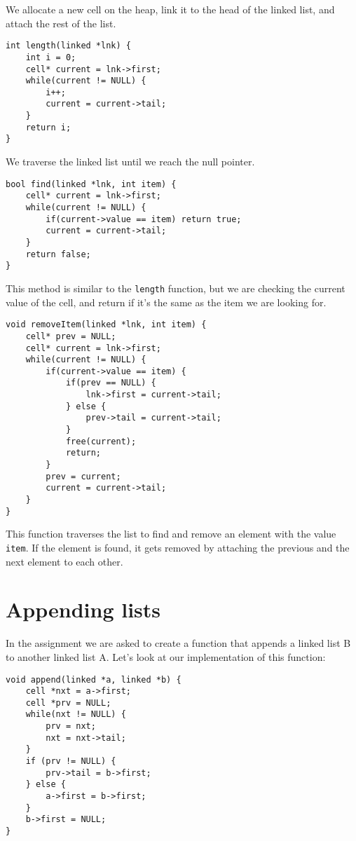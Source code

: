 \documentclass[a4paper,11pt]{article}
\begin{document}
    We allocate a new cell on the heap, link it to the head of the linked list, and attach the rest of the list.

    \begin{verbatim}
int length(linked *lnk) {
    int i = 0;
    cell* current = lnk->first;
    while(current != NULL) {
        i++;
        current = current->tail;
    }
    return i;
}
    \end{verbatim}

    We traverse the linked list until we reach the null pointer.

    \begin{verbatim}
bool find(linked *lnk, int item) {
    cell* current = lnk->first;
    while(current != NULL) {
        if(current->value == item) return true;
        current = current->tail;
    }
    return false;
}
    \end{verbatim}

    This method is similar to the {\tt length} function, but we are checking the current value of the cell, and return if it's the same as the item we are looking for.

    \begin{verbatim}
void removeItem(linked *lnk, int item) {
    cell* prev = NULL;
    cell* current = lnk->first;
    while(current != NULL) {
        if(current->value == item) {
            if(prev == NULL) {
                lnk->first = current->tail;
            } else {
                prev->tail = current->tail;
            }
            free(current);
            return;
        }
        prev = current;
        current = current->tail;
    }
}
    \end{verbatim}

    This function traverses the list to find and remove an element with the value {\tt item}.
    If the element is found, it gets removed by attaching the previous and the next element to each other.

    \section*{Appending lists}

    In the assignment we are asked to create a function that appends a linked list B to another linked list A.
    Let's look at our implementation of this function:

    \begin{verbatim}
void append(linked *a, linked *b) {
    cell *nxt = a->first;
    cell *prv = NULL;
    while(nxt != NULL) {
        prv = nxt;
        nxt = nxt->tail;
    }
    if (prv != NULL) {
        prv->tail = b->first;
    } else {
        a->first = b->first;
    }
    b->first = NULL;
}
    \end{verbatim}
\end{document}
